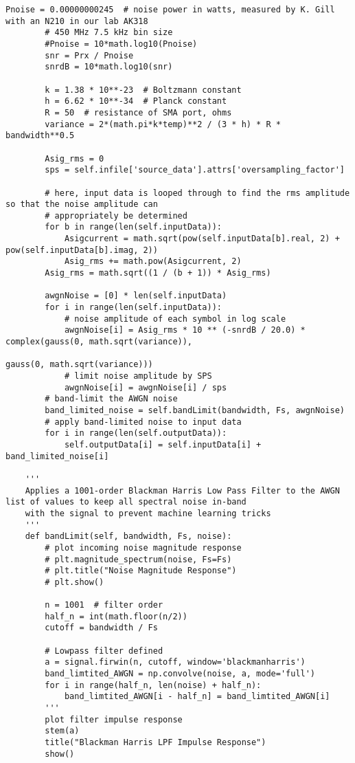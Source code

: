 \begin{lstlisting}[breaklines]
        Pnoise = 0.00000000245  # noise power in watts, measured by K. Gill with an N210 in our lab AK318
        # 450 MHz 7.5 kHz bin size
        #Pnoise = 10*math.log10(Pnoise)
        snr = Prx / Pnoise
        snrdB = 10*math.log10(snr)

        k = 1.38 * 10**-23  # Boltzmann constant
        h = 6.62 * 10**-34  # Planck constant
        R = 50  # resistance of SMA port, ohms
        variance = 2*(math.pi*k*temp)**2 / (3 * h) * R * bandwidth**0.5

        Asig_rms = 0
        sps = self.infile['source_data'].attrs['oversampling_factor']

        # here, input data is looped through to find the rms amplitude so that the noise amplitude can
        # appropriately be determined
        for b in range(len(self.inputData)):
            Asigcurrent = math.sqrt(pow(self.inputData[b].real, 2) + pow(self.inputData[b].imag, 2))
            Asig_rms += math.pow(Asigcurrent, 2)
        Asig_rms = math.sqrt((1 / (b + 1)) * Asig_rms)

        awgnNoise = [0] * len(self.inputData)
        for i in range(len(self.inputData)):
            # noise amplitude of each symbol in log scale
            awgnNoise[i] = Asig_rms * 10 ** (-snrdB / 20.0) * complex(gauss(0, math.sqrt(variance)),
                                                                   gauss(0, math.sqrt(variance)))
            # limit noise amplitude by SPS
            awgnNoise[i] = awgnNoise[i] / sps
        # band-limit the AWGN noise
        band_limited_noise = self.bandLimit(bandwidth, Fs, awgnNoise)
        # apply band-limited noise to input data
        for i in range(len(self.outputData)):
            self.outputData[i] = self.inputData[i] + band_limited_noise[i]

    '''
    Applies a 1001-order Blackman Harris Low Pass Filter to the AWGN list of values to keep all spectral noise in-band
    with the signal to prevent machine learning tricks
    '''
    def bandLimit(self, bandwidth, Fs, noise):
        # plot incoming noise magnitude response
        # plt.magnitude_spectrum(noise, Fs=Fs)
        # plt.title("Noise Magnitude Response")
        # plt.show()

        n = 1001  # filter order
        half_n = int(math.floor(n/2))
        cutoff = bandwidth / Fs

        # Lowpass filter defined
        a = signal.firwin(n, cutoff, window='blackmanharris')
        band_limtited_AWGN = np.convolve(noise, a, mode='full')
        for i in range(half_n, len(noise) + half_n):
            band_limtited_AWGN[i - half_n] = band_limtited_AWGN[i]
        '''
        plot filter impulse response
        stem(a)
        title("Blackman Harris LPF Impulse Response")
        show()


\end{lstlisting}
